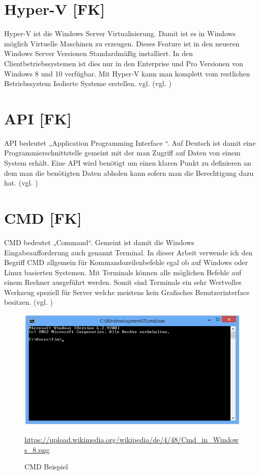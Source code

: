 \section{Hyper-V [FK]}\label{Hyper-V}
Hyper-V ist die Windows Server Virtualisierung. Damit ist es in Windows möglich Virtuelle Maschinen zu erzeugen. Dieses Feature ist in den neueren Windows Server Versionen Standardmäßig installiert. In den Clientbetriebssystemen ist dies nur in den Enterprise und Pro Versionen von Windows 8 und 10 verfügbar. Mit Hyper-V kann man komplett vom restlichen Betriebssystem Isolierte Systeme erstellen.
vgl. (vgl. \cite{Hyper-V})
\section{API [FK]}\label{sec:API}
API bedeutet „Application Programming Interface “. Auf Deutsch ist damit eine Programmierschnittstelle gemeint mit der man Zugriff auf Daten von einem System erhält. Eine API wird benötigt um einen klaren Punkt zu definieren an dem man die benötigten Daten abholen kann sofern man die Berechtigung dazu hat. (vgl. \cite{API})
\section{CMD [FK]}\label{sec:CMD}
CMD bedeutet „Command“. Gemeint ist damit die Windows Eingabeaufforderung auch genannt Terminal. In dieser Arbeit verwende ich den Begriff CMD allgemein für Kommandozeilenbefehle egal ob auf Windows oder Linux basierten Systemen. Mit Terminals können alle möglichen Befehle auf einem Rechner ausgeführt werden. Somit sind Terminals ein sehr Wertvolles Werkzeug speziell für Server welche meistens kein Grafisches Benutzerinterface besitzen. (vgl. \cite{CMD})
\begin{figure}[H]
    \includegraphics[scale=0.8]{images/cmdExample.png}
    \caption{CMD Beispiel}
    \label{img:cmdExample}
    \url{https://upload.wikimedia.org/wikipedia/de/4/48/Cmd_in_Windows_8.png}
\end{figure}
